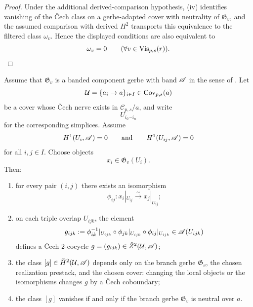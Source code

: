 \begin{proof}
Under the additional derived-comparison hypothesis, (iv) identifies vanishing of the \v{C}ech class on a gerbe-adapted cover with neutrality of $\mathfrak G_v$, and the assumed comparison with derived $H^2$ transports this equivalence to the filtered class $\omega_v$. Hence the displayed conditions are also equivalent to
\[
\omega_v=0
\qquad
(\forall v\in \mathrm{Vis}_{p,s}(r)).
\qedhere
\]
\end{proof}

\begin{proposition}\label{thm:cech-bridge-compatible-realizations}
Assume that $\mathfrak G_v$ is a banded component gerbe with band $\mathscr{A}$ in the sense of . Let
\[
\mathcal U=\{a_i\to a\}_{i\in I}\in \mathrm{Cov}_{p,s}(a)
\]
be a cover whose \v{C}ech nerve exists in $\mathcal C_{p,s}/a$, and write
\[
U_{i_0\cdots i_n}
\]
for the corresponding simplices. Assume
\[
H^1(U_i,\mathscr{A})=0
\qquad\text{and}\qquad
H^1(U_{ij},\mathscr{A})=0
\]
for all $i,j\in I$. Choose objects
\[
x_i\in \mathfrak G_v(U_i).
\]
Then:
\begin{enumerate}[label=(\roman*),nosep]
\item for every pair $(i,j)$ there exists an isomorphism
\[
\phi_{ij}:x_i|_{U_{ij}}\xrightarrow{\sim} x_j|_{U_{ij}};
\]
\item on each triple overlap $U_{ijk}$, the element
\[
g_{ijk}:=\phi_{ik}^{-1}|_{U_{ijk}}\circ \phi_{jk}|_{U_{ijk}}\circ \phi_{ij}|_{U_{ijk}}
\in \mathscr{A}(U_{ijk})
\]
defines a \v{C}ech $2$-cocycle $g=(g_{ijk})\in \check Z^2(\mathcal U,\mathscr{A})$;
\item the class $[g]\in \check{H}^2(\mathcal U,\mathscr{A})$ depends only on the branch gerbe $\mathfrak G_v$, the chosen realization prestack, and the chosen cover: changing the local objects or the isomorphisms changes $g$ by a \v{C}ech coboundary;
\item the class $[g]$ vanishes if and only if the branch gerbe $\mathfrak G_v$ is neutral over $a$.
\end{enumerate}
\end{proposition}

